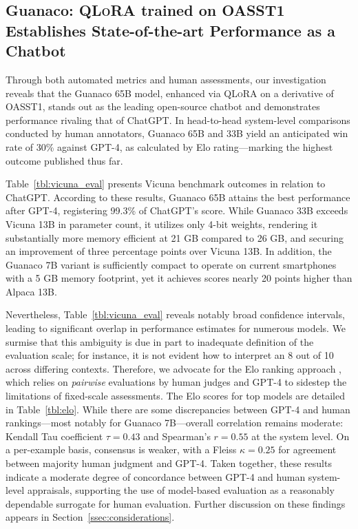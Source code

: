 \subsection{\textbf{Guanaco}: \textsc{QLoRA} trained on OASST1 Establishes State-of-the-art Performance as a Chatbot} Through both automated metrics and human assessments, our investigation reveals that the {Guanaco} 65B model, enhanced via \textsc{QLoRA} on a derivative of OASST1, stands out as the leading open-source chatbot and demonstrates performance rivaling that of ChatGPT. In head-to-head system-level comparisons conducted by human annotators, {Guanaco} 65B and 33B yield an anticipated win rate of 30\% against GPT-4, as calculated by Elo rating—marking the highest outcome published thus far.

Table~\ref{tbl:vicuna_eval} presents Vicuna benchmark outcomes \cite{vicuna2023} in relation to ChatGPT. According to these results, {Guanaco} 65B attains the best performance after GPT-4, registering 99.3\% of ChatGPT’s score. While {Guanaco} 33B exceeds Vicuna 13B in parameter count, it utilizes only 4-bit weights, rendering it substantially more memory efficient at 21 GB compared to 26 GB, and securing an improvement of three percentage points over Vicuna 13B. In addition, the {Guanaco} 7B variant is sufficiently compact to operate on current smartphones with a 5 GB memory footprint, yet it achieves scores nearly 20 points higher than Alpaca 13B.

Nevertheless, Table~\ref{tbl:vicuna_eval} reveals notably broad confidence intervals, leading to significant overlap in performance estimates for numerous models. We surmise that this ambiguity is due in part to inadequate definition of the evaluation scale; for instance, it is not evident how to interpret an 8 out of 10 across differing contexts. Therefore, we advocate for the Elo ranking approach \citep{elo1967proposed}, which relies on \textit{pairwise} evaluations by human judges and GPT-4 to sidestep the limitations of fixed-scale assessments. The Elo scores for top models are detailed in Table~\ref{tbl:elo}. While there are some discrepancies between GPT-4 and human rankings—most notably for Guanaco 7B—overall correlation remains moderate: Kendall Tau coefficient $\tau=0.43$ and Spearman’s $r=0.55$ at the system level. On a per-example basis, consensus is weaker, with a Fleiss $\kappa=0.25$ for agreement between majority human judgment and GPT-4. Taken together, these results indicate a moderate degree of concordance between GPT-4 and human system-level appraisals, supporting the use of model-based evaluation as a reasonably dependable surrogate for human evaluation. Further discussion on these findings appears in Section~\ref{ssec:considerations}.

